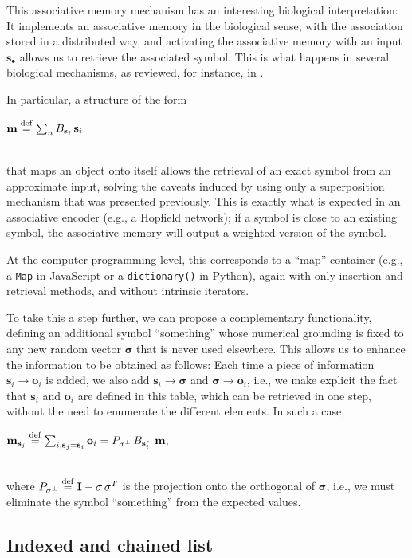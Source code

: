 \documentclass[sn-mathphys]{sn-jnl}
\newcommand{\defq}{\stackrel {\rm def}{=}}
\newcommand{\eqline}[1]{~\vspace{0.1cm}\\\centerline{$#1$}\vspace{0.1cm}\\}
\begin{document}
\begin{appendices}
This associative memory mechanism has an interesting biological interpretation: It implements an associative memory in the biological sense, with the association stored in a distributed way, and activating the associative memory with an input $\mathbf{s}_\bullet$ allows us to retrieve the associated symbol. This is what happens in several biological mechanisms, as reviewed, for instance, in \cite{eichenbaum_memory_2017}. 

In particular, a structure of the form
\eqline{\mathbf{m} \defq \sum_n B_{\mathbf{s}_i} \, \mathbf{s}_i}
that maps an object onto itself allows the retrieval of an exact symbol from an approximate input, solving the caveats induced by using only a superposition mechanism that was presented previously. This is exactly what is expected in an associative encoder (e.g., a Hopfield network); if a symbol is close to an existing symbol, the associative memory will output a weighted version of the symbol.

At the computer programming level, this corresponds to a ``map'' container (e.g., a {\tt Map} in JavaScript or a {\tt dictionary()} in Python), again with only insertion and retrieval methods, and without intrinsic iterators.

To take this a step further, we can propose a complementary functionality, defining an additional symbol ``something'' whose numerical grounding is fixed to any new random vector $\mathbf{\sigma}$ that is never used elsewhere. This allows us to enhance the information to be obtained as follows: Each time a piece of information $\mathbf{s}_i \rightarrow \mathbf{o}_i$ is added, we also add $\mathbf{s}_i \rightarrow \mathbf{\sigma}$  and $\mathbf{\sigma} \rightarrow \mathbf{o}_i$, i.e., we make explicit the fact that $\mathbf{s}_i$ and $\mathbf{o}_i$ are defined in this table, which can be retrieved in one step, without the need to enumerate the different elements. In such a case,
\eqline{\mathbf{m}_{\mathbf{s}_j} \defq \sum_{i, \mathbf{s}_j = \mathbf{s}_i} \mathbf{o}_i = P_{\mathbf{\sigma}^\perp} \,  B_{\mathbf{s}_i^\sim} \, \mathbf{m},}
where $P_{\mathbf{\sigma}^\perp} \defq \mathbf{I} - \mathbf{\sigma} \, \mathbf{\sigma}^T$ is the projection onto the orthogonal of $\mathbf{\sigma}$, i.e., we must eliminate the symbol ``something'' from the expected values.

\subsection{Indexed and chained list}


\end{appendices}
\end{document}
